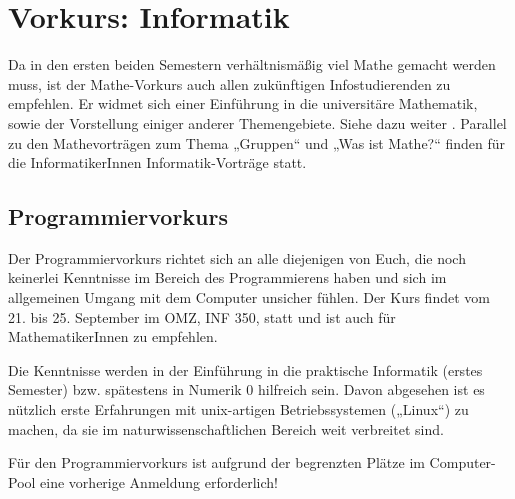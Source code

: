 \section{Vorkurs: Informatik}
\label{vkinfo}
Da in den ersten beiden Semestern verhältnismäßig viel Mathe gemacht werden muss, ist der Mathe-Vorkurs auch allen zukünftigen Infostudierenden zu empfehlen. Er widmet sich einer Einführung in die universitäre Mathematik, sowie der Vorstellung einiger anderer Themengebiete. Siehe dazu weiter
.
Parallel zu den Mathevorträgen zum Thema „Gruppen“ und „Was ist Mathe?“ finden für die InformatikerInnen Informatik-Vorträge statt.

\parskip

\subsection{Programmiervorkurs}
Der Programmiervorkurs richtet sich an alle diejenigen von Euch, die noch keinerlei Kenntnisse im Bereich des Programmierens haben und sich im allgemeinen Umgang mit dem Computer unsicher fühlen. Der Kurs findet vom 21. bis 25. September im OMZ, \gls{INF} 350, statt und ist auch für MathematikerInnen zu empfehlen.

Die Kenntnisse werden in der Einführung in die praktische Informatik (erstes
Semester) bzw. spätestens in Numerik 0 hilfreich sein. Davon abgesehen ist es
nützlich erste Erfahrungen mit unix-artigen Betriebssystemen („Linux“) zu
machen, da sie im naturwissenschaftlichen Bereich weit verbreitet sind.

Für den Programmiervorkurs ist aufgrund der begrenzten Plätze im Computer-Pool
eine vorherige Anmeldung erforderlich!

